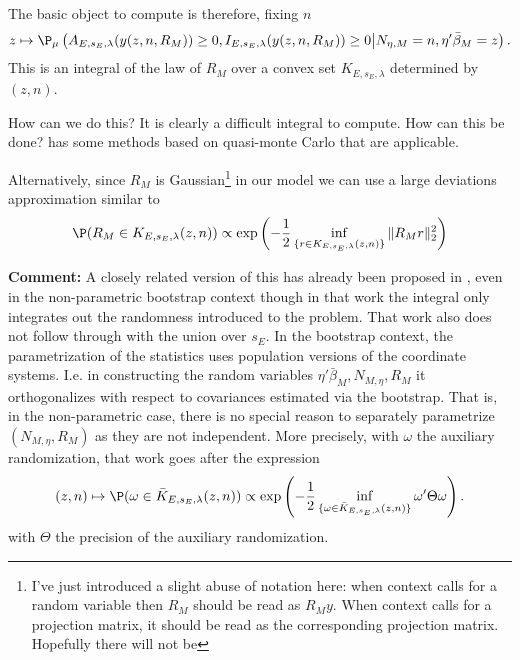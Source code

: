 \documentclass{article}
\newcommand{\OLS}{\bar{\beta}}
\begin{document}
        The basic object to compute is therefore, fixing $n$
        $$ z \mapsto \P_{\mu}\left( A_{E,s_E,\lambda}(y(z,n,R_M)) \geq 0, I_{E,s_E,\lambda}(y(z,n,R_M))
        \geq 0  \bigl | N_{\eta,M}=n, \eta'\OLS_M=z \right).
        $$ This is an integral of the law of $R_M$ over a convex set
        $K_{E,s_E,\lambda}$ determined by $(z,n)$.

        How can we do this? It is clearly a difficult integral to
        compute. How can this be done? \cite{sifan} has some methods
        based on quasi-monte Carlo that are applicable.

        Alternatively, since $R_M$ is Gaussian\footnote{I've just
        introduced a slight abuse of notation here: when context calls
        for a random variable then $R_M$ should be read as
        $R_My$. When context calls for a projection matrix, it should
        be read as the corresponding projection matrix. Hopefully
        there will not be } in our model we can use a large deviations
        approximation similar to \cite{snigdha...}
        \begin{equation}
          \label{eq:LD}
        \P(R_M \in K_{E,s_E,\lambda}(z,n)) \propto \exp\left(-\frac{1}{2}
        \inf_{\{r \in K_{E,s_E,\lambda}(z,n)\}} \|R_Mr\|^2_2\right)
        \end{equation}

        {\bf Comment:} A closely related version of this has already been
        proposed in \cite{snigdha:jelena}, even in the non-parametric
        bootstrap context though in that work the integral only
        integrates out the randomness introduced to the problem.  That
        work also does not follow through with the union over $s_E$.
        In the bootstrap context, the parametrization of the
        statistics uses population versions of the coordinate
        systems. I.e. in constructing the random variables
        $\eta'\OLS_M, N_{M,\eta}, R_M$ it orthogonalizes with respect
        to covariances estimated via the bootstrap.  That is, in the
        non-parametric case, there is no special reason to separately
        parametrize $(N_{M,\eta}, R_M)$ as they are not independent.
        More precisely, with $\omega$ the auxiliary randomization,
        that work goes after the expression
        \begin{equation}
          \label{eq:LD:rand}
        (z,n) \mapsto \P(\omega \in \bar{K}_{E,s_E,\lambda}(z,n)) \propto
          \exp\left(-\frac{1}{2} \inf_{\{\omega \in
            \bar{K}_{E,s_E,\lambda}(z,n)\}} \omega' \Theta \omega\right).
        \end{equation}
        with $\Theta$ the precision of the auxiliary randomization.
\end{document}
